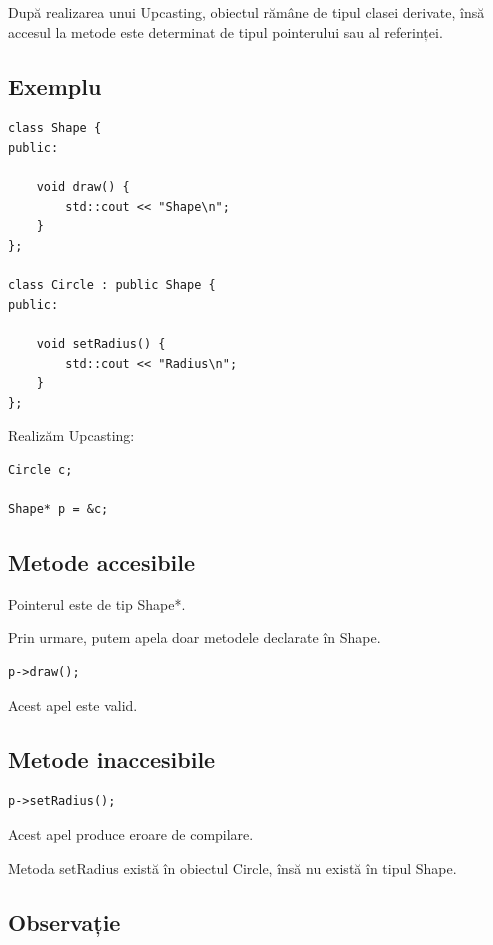 \documentclass[12pt,a4paper]{article}
\begin{document}
După realizarea unui Upcasting, obiectul rămâne de tipul clasei derivate, însă accesul la metode este determinat de tipul pointerului sau al referinței.

\subsection{Exemplu}

\begin{verbatim}
class Shape {
public:

    void draw() {
        std::cout << "Shape\n";
    }
};

class Circle : public Shape {
public:

    void setRadius() {
        std::cout << "Radius\n";
    }
};
\end{verbatim}

Realizăm Upcasting:

\begin{verbatim}
Circle c;

Shape* p = &c;
\end{verbatim}

\subsection{Metode accesibile}

Pointerul este de tip Shape*.

Prin urmare, putem apela doar metodele declarate în Shape.

\begin{verbatim}
p->draw();
\end{verbatim}

Acest apel este valid.

\subsection{Metode inaccesibile}

\begin{verbatim}
p->setRadius();
\end{verbatim}

Acest apel produce eroare de compilare.

Metoda setRadius există în obiectul Circle, însă nu există în tipul Shape.

\subsection{Observație}
\end{document}
